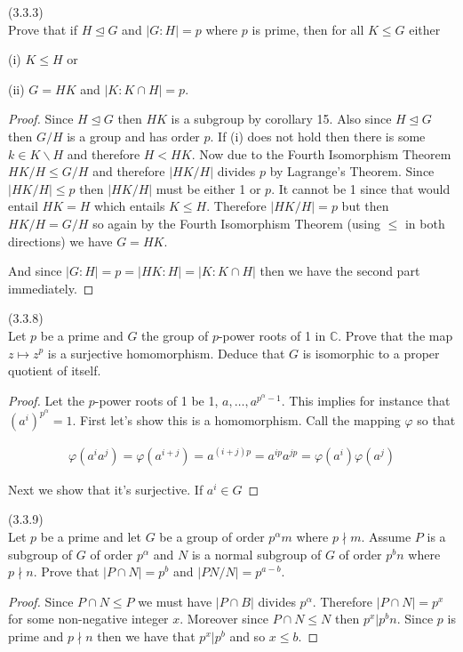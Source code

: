 \documentclass{exam}
\begin{document}
\begin{questions}
\question(3.3.3)\\
Prove that if $H\trianglelefteq G$ and $|G:H| = p$ where $p$ is prime, then for all $K\leq G$ either

(i) $K\leq H$ or

(ii) $G=HK$ and $|K:K\cap H|=p$.

\begin{proof}
  Since $H\trianglelefteq G$ then $HK$ is a subgroup by corollary 15.  Also since $H\trianglelefteq G$ then $G/H$ is a group and has order $p$.  If (i) does not hold then there is some $k\in K\smallsetminus H$ and therefore $H < HK$.  Now due to the Fourth Isomorphism Theorem $HK/H \leq G/H$ and therefore $|HK/H|$ divides $p$ by Lagrange's Theorem.  Since $|HK/H|\leq p$ then $|HK/H|$ must be either 1 or $p$.  It cannot be 1 since that would entail $HK = H$ which entails $K\leq H$.  Therefore $|HK/H|=p$ but then $HK/H=G/H$ so again by the Fourth Isomorphism Theorem (using $\leq$ in both directions) we have $G=HK$.

  And since $|G:H|=p=|HK:H|=|K:K\cap H|$ then we have the second part immediately.
\end{proof}

\question(3.3.8)\\
Let $p$ be a prime and $G$ the group of $p$-power roots of 1 in $\mathbb C$.  Prove that the map $z\mapsto z^p$ is a surjective homomorphism.  Deduce that $G$ is isomorphic to a proper quotient of itself.

\begin{proof}
  Let the $p$-power roots of 1 be 1, $a, \dots, a^{p^\alpha-1}$.  This implies for instance that $(a^i)^{p^\alpha}=1$.  First let's show this is a homomorphism.  Call the mapping $\varphi$ so that

  \begin{align*}
    \varphi(a^ia^j) = \varphi(a^{i+j}) = a^{(i+j)p} = a^{ip}a^{jp} = \varphi(a^i)\varphi(a^j)
  \end{align*}

  Next we show that it's surjective.  If $a^i\in G$
\end{proof}

\question(3.3.9)\\
Let $p$ be a prime and let $G$ be a group of order $p^\alpha m$ where $p\nmid m$.  Assume $P$ is a subgroup of $G$ of order $p^\alpha$ and $N$ is a normal subgroup of $G$ of order $p^bn$ where $p\nmid n$.  Prove that $|P\cap N|=p^b$ and $|PN/N|=p^{a-b}$.

\begin{proof}
  Since $P\cap N\leq P$ we must have $|P\cap B|$ divides $p^\alpha$.  Therefore $|P\cap N|=p^x$ for some non-negative integer $x$.  Moreover since $P\cap N \leq N$ then $p^{x}|p^{b}n$.  Since $p$ is prime and $p\nmid n$ then we have that $p^x | p^b$ and so $x \leq b$.


\end{proof}
\end{questions}
\end{document}
